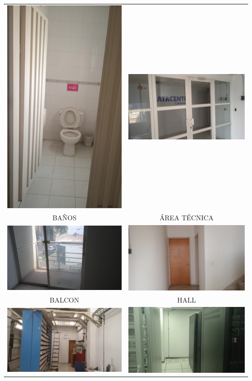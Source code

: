 \documentclass[12pt,a4paper,twoside]{article}
\begin{document}
{\begin{tabular}{ c c }
	\includegraphics[width = 3 cm]{Imagenes/17} & \includegraphics[width = 7 cm]{Imagenes/18} \\
    BAÑOS & ÁREA TÉCNICA \\
	\includegraphics[width = 7 cm]{Imagenes/19} & \includegraphics[width = 7 cm]{Imagenes/20} \\
	BALCON & HALL\\
	\includegraphics[width = 7 cm]{Imagenes/21} & \includegraphics[width = 7 cm]{Imagenes/22} \\

\end{tabular}}
\end{document}
